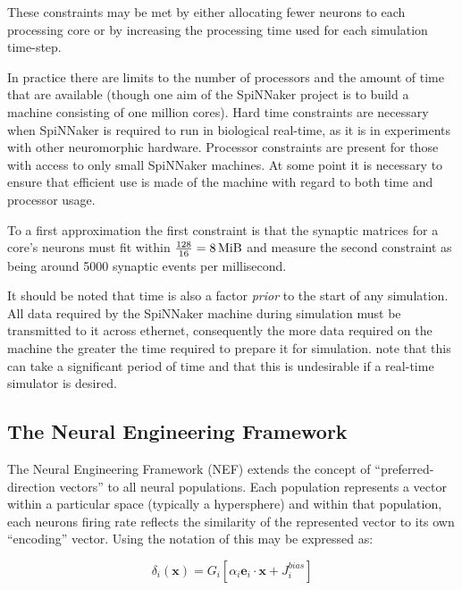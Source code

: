 \documentclass[conference]{IEEEtran}
\renewcommand{\vec}{\mathbf}  %
\begin{document}
These constraints may be met by either allocating fewer neurons to each processing core or by increasing the processing time used for each simulation time-step.

In practice there are limits to the number of processors and the amount of time that are available (though one aim of the SpiNNaker project is to build a machine consisting of one million cores). Hard time constraints are necessary when SpiNNaker is required to run in biological real-time, as it is in experiments with other neuromorphic hardware. Processor constraints are present for those with access to only small SpiNNaker machines. At some point it is necessary to ensure that efficient use is made of the machine with regard to both time and processor usage.

To a first approximation the first constraint is that the synaptic matrices for a core's neurons must fit within $\frac{128}{16} = \SI{8}{\mebi\byte}$ and \textcite[\S III.C]{Sharp2013} measure the second constraint as being around \num{5000} synaptic events per millisecond.

It should be noted that time is also a factor \textit{prior} to the start of any simulation. All data required by the SpiNNaker machine during simulation must be transmitted to it across ethernet, consequently the more data required on the machine the greater the time required to prepare it for simulation. \textcite{Sharp2013} note that this can take a significant period of time and that this is undesirable if a real-time simulator is desired.

  \subsection{The Neural Engineering Framework}
  \label{sef:background/nef}

The Neural Engineering Framework (NEF) extends the concept of ``preferred-direction vectors'' \parencite{} to all neural populations. Each population represents a vector within a particular space (typically a hypersphere) and within that population, each neurons firing rate reflects the similarity of the represented vector to its own ``encoding'' vector. Using the notation of \textcite{Stewart2014} this may be expressed as:

\begin{equation}
  \delta_{i}\left(\vec{x}\right) = G_{i}\left[ \alpha_i \vec{e}_i \cdot \vec{x} + J^{bias}_i \right]
  \label{eq:encoding}
\end{equation}
\end{document}
